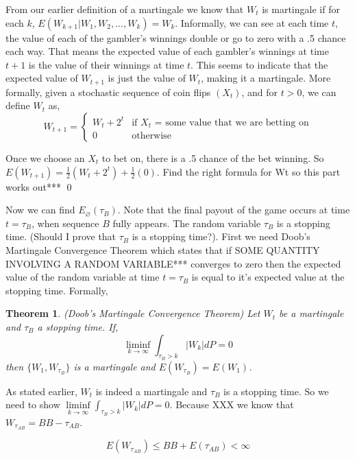 \documentclass{article}
\newtheorem{theorem}{Theorem}[section]
\numberwithin{mytheorem}{subsection} %
\begin{document}
		\begin{PROOF}
			From our earlier definition of a martingale we know that $W_t$ is martingale if for each $k$, $E(W_{k+1} | W_1,W_2,...,W_k) = W_k$. Informally, we can see at each time $t$, the value of each of the gambler's winnings double or go to zero with a .5 chance each way. That means the expected value of each gambler's winnings at time $t+1$ is the value of their winnings at time $t$. This seems to indicate that the expected value of $W_{t+1}$ is just the value of $W_t$, making it a martingale. More formally, given a stochastic sequence of coin flips $(X_t)$, and for $t > 0$, we can define $W_t$ as, 
		    \[ W_{t+1}=\begin{cases} 
		      W_{t} + 2^t & \text{if $X_t$ = some value that we are betting on}\\
		      0 & \text{otherwise} 
			  \end{cases} \]

			 Once we choose an $X_t$ to bet on, there is a .5 chance of the bet winning. So $E(W_{t+1}) = \frac{1}{2}(W_t + 2^t) + \frac{1}{2}(0)$. Find the right formula for Wt so this part works out*** \qed
		\end{PROOF}


		Now we can find $E_{\varnothing}(\tau_{B})$. Note that the final payout of the game occurs at time $t=\tau_{B}$, when sequence $B$ fully appears. The random variable $\tau_B$ is a stopping time. (Should I prove that $\tau_{B}$ is a stopping time?). First we need Doob's Martingale Convergence Theorem which states that if SOME QUANTITY INVOLVING A RANDOM VARIABLE*** converges to zero then the expected value of the random variable at time $t=\tau_B$ is equal to it's expected value at the stopping time. Formally,

		\begin{theorem}(Doob's Martingale Convergence Theorem)
			Let $W_t$ be a martingale and $\tau_B$ a stopping time. If,
			$$\liminf\limits_{k\rightarrow \infty} \int_{\tau_B > k} |W_k|dP = 0$$
			then $\{W_1, W_{\tau_B}\}$ is a martingale and $E(W_{\tau_B}) = E(W_1)$.
		\end{theorem}

		As stated earlier, $W_t$ is indeed a martingale and $\tau_B$ is a stopping time. So we need to show $\liminf\limits_{k\rightarrow \infty} \int_{\tau_B > k} |W_k|dP = 0$. Because XXX we know that $W_{\tau_{AB}} = BB - \tau_{AB}$.

		$$E(W_{\tau_{AB}}) \leq BB + E(\tau_{AB}) < \infty$$
\end{document}

